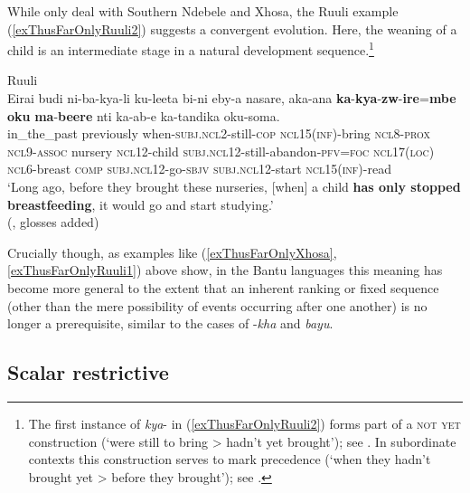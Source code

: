 While \textcite{CranePersohn2021} only deal with Southern Ndebele and Xhosa, the Ruuli example (\ref{exThusFarOnlyRuuli2}) suggests a convergent evolution. Here, the weaning of a child is an intermediate stage in a natural development sequence.\footnote{The first instance of \textit{kya}- in (\ref{exThusFarOnlyRuuli2}) forms part of a \textsc{not yet} construction (\lq were still to bring > hadn't yet brought\rq{}); see . In subordinate contexts this construction serves to mark precedence (\lq when they hadn't brought yet > before they brought\rq{}); see .}

\begin{exe}
	\ex Ruuli\label{exThusFarOnlyRuuli2}\\
	\gll Eirai budi ni-ba-kya-li ku-leeta bi-ni eby-a nasare, aka-ana \textbf{ka}-\textbf{kya}-\textbf{zw}-\textbf{ire}=\textbf{mbe} \textbf{oku} \textbf{ma}-\textbf{beere} nti ka-ab-e ka-tandika oku-soma.\\
	in\_the\_past previously when-\textsc{subj}.\textsc{ncl}2-still-\textsc{cop} \textsc{ncl}15(\textsc{inf})-bring \textsc{ncl}8-\textsc{prox} \textsc{ncl}9-\textsc{assoc} nursery \textsc{ncl}12-child \textsc{subj}.\textsc{ncl}12-still-abandon-\textsc{pfv}=\textsc{foc} \textsc{ncl}17(\textsc{loc}) \textsc{ncl}6-breast \textsc{comp} \textsc{subj}.\textsc{ncl}12-go-\textsc{sbjv} \textsc{subj}.\textsc{ncl}12-start \textsc{ncl}15(\textsc{inf})-read\\
	\glt \lq Long ago, before they brought these nurseries, [when] a child \textbf{has only stopped breastfeeding}, it would go and start studying.'
	\\(\cite{RuuliCorpus}, glosses added)
\end{exe}

Crucially though, as examples like (\ref{exThusFarOnlyXhosa}, \ref{exThusFarOnlyRuuli1}) above show, in the Bantu languages this meaning has become more general to the extent that an inherent ranking or fixed sequence (other than the mere possibility of events occurring after one another) is no longer a prerequisite, similar to the cases of  \mbox{-\textit{kha}} and  \textit{bayu}.

\subsection{Scalar restrictive}
\label{sectionScalarRestrictive}
